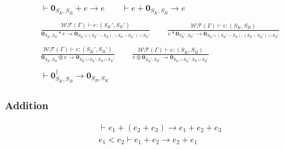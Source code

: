\begin{align*}
  & \vdash \textbf{0}_{S_K, S_B} + e \to e
  \qquad \vdash e + \textbf{0}_{S_K, S_B} \to e\\
  &\ \\
  & \frac{\mathcal{WF}(\Gamma)\vdash e : (S_K', S_B')}{\textbf{0}_{S_K, S_B} * e \to \textbf{0}_{S_K \cup (S_K' - S_B), (S_B-S_K') \cup S_B'}}
  \qquad \frac{\mathcal{WF}(\Gamma)\vdash e : (S_K, S_B)}{e * \textbf{0}_{S_K', S_B'} \to \textbf{0}_{S_K \cup (S_K' - S_B), (S_B-S_K') \cup S_B'}}\\
  &\ \\
  & \frac{\mathcal{WF}(\Gamma)\vdash e : (S_K', S_B')}{\textbf{0}_{S_K, S_B} \otimes e \to \textbf{0}_{S_K \cup S_K', S_B \cup S_B'}}
  \qquad \frac{\mathcal{WF}(\Gamma)\vdash e : (S_K, S_B)}{e \otimes \textbf{0}_{S_K', S_B'} \to \textbf{0}_{S_K \cup S_K', S_B \cup S_B'}}\\
  &\ \\
  & \vdash \textbf{0}_{S_K, S_B}^\dagger \to \textbf{0}_{S_B, S_K}
\end{align*}

\subsubsection*{Addition}
\begin{align*}
  & \vdash e_1 + (e_2 + e_3) \to e_1 + e_2 + e_3 \\
  & e_1 < e_2 \vdash e_1 + e_2 \to e_2 + e_1
\end{align*}

